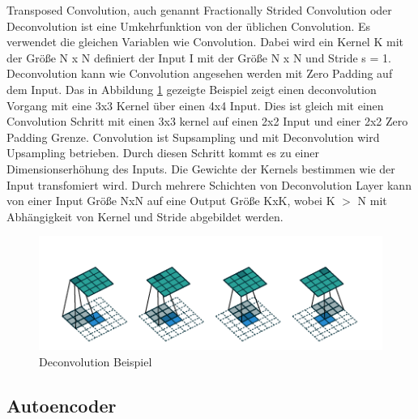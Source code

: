 \documentclass{llncs}
\begin{document}
Transposed Convolution, auch genannt Fractionally Strided Convolution oder Deconvolution ist eine Umkehrfunktion von der üblichen Convolution. Es verwendet die gleichen Variablen wie Convolution. Dabei wird ein Kernel K mit der Größe N x N definiert der Input I mit der Größe N x N und Stride s = 1. Deconvolution kann wie Convolution angesehen werden mit  Zero Padding auf dem Input.  Das in Abbildung \ref{fig:Bild4} gezeigte Beispiel zeigt einen deconvolution Vorgang mit eine 3x3 Kernel über einen 4x4 Input. Dies ist gleich mit einen Convolution Schritt mit einen 3x3 kernel auf einen 2x2 Input und einer 2x2 Zero Padding Grenze. Convolution ist Supsampling und mit Deconvolution wird Upsampling betrieben. Durch diesen Schritt kommt es zu einer Dimensionserhöhung des Inputs. Die Gewichte der Kernels bestimmen wie der Input transfomiert wird. Durch mehrere Schichten von Deconvolution Layer kann von einer Input Größe NxN auf eine Output Größe KxK, wobei K $>$ N mit Abhängigkeit von Kernel und Stride abgebildet werden\cite{conv}. 

\begin{figure}[htbp] 
	\centering
	\includegraphics[width=1.0\textwidth]{decon.png}
	\caption{Deconvolution Beispiel}
	\label{fig:Bild4}
\end{figure}
\newpage

\subsection{Autoencoder}
\end{document}
